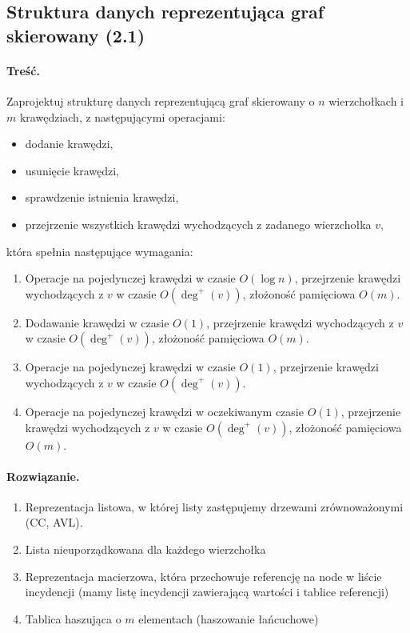 \subsection{Struktura danych reprezentująca graf skierowany (2.1)}

\paragraph{Treść.} Zaprojektuj strukturę danych reprezentującą graf skierowany o $n$ wierzchołkach i $m$ krawędziach, z
następującymi operacjami:
\begin{itemize}
	\item dodanie krawędzi,
	\item usunięcie krawędzi,
	\item sprawdzenie istnienia krawędzi,
	\item przejrzenie wszystkich krawędzi wychodzących z zadanego wierzchołka $v$,
\end{itemize}
która spełnia następujące wymagania:
\begin{enumerate}[label=\alph*)]
	\item Operacje na pojedynczej krawędzi w czasie $O(\log n)$, przejrzenie krawędzi wychodzących z $v$ w czasie $O(\deg^+(v))$, 
	złożoność pamięciowa $O(m)$.
	\item Dodawanie krawędzi w czasie $O(1)$, przejrzenie krawędzi wychodzących z $v$ w czasie $O(\deg^+(v))$, złożoność
	pamięciowa $O(m)$.
	\item Operacje na pojedynczej krawędzi w czasie $O(1)$, przejrzenie krawędzi wychodzących z $v$ w czasie $O(\deg^+(v))$.
	\item Operacje na pojedynczej krawędzi w oczekiwanym czasie $O(1)$, przejrzenie krawędzi wychodzących z $v$ w czasie
	$O(\deg^+(v))$, złożoność pamięciowa $O(m)$.
\end{enumerate}

\paragraph{Rozwiązanie.}
\begin{enumerate}[label=\alph*)]
	\item Reprezentacja listowa, w której 
	listy zastępujemy drzewami zrównoważonymi (CC, AVL).
	\item Lista nieuporządkowana dla każdego wierzchołka
	\item Reprezentacja macierzowa, która przechowuje
	referencję na node w liście incydencji (mamy listę incydencji zawierającą wartości i tablice referencji)
	\item Tablica haszująca o $m$ elementach (haszowanie łańcuchowe)
\end{enumerate}

